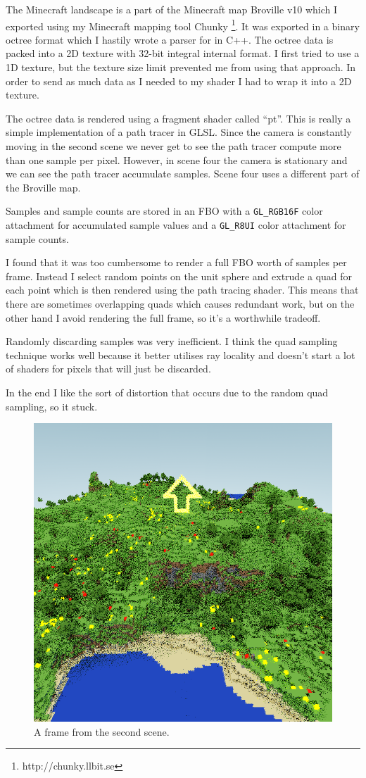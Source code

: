 \documentclass{acmsiggraph}               %
\begin{document}
The Minecraft landscape is a part of the Minecraft map Broville v10 which I
exported using my Minecraft mapping tool Chunky
\footnote{http://chunky.llbit.se}. It was exported in a binary octree format
which I hastily wrote a parser for in C++. The octree data is packed into a 2D
texture with 32-bit integral internal format. I first tried to use a 1D
texture, but the texture size limit prevented me from using that approach. In
order to send as much data as I needed to my shader I had to wrap it into a 2D
texture.

The octree data is rendered using a fragment shader called ``pt''. This is
really a simple implementation of a path tracer in GLSL.  Since the camera is
constantly moving in the second scene we never get to see the path tracer
compute more than one sample per pixel. However, in scene four the camera is
stationary and we can see the path tracer accumulate samples. Scene four
uses a different part of the Broville map.

Samples and sample counts are stored in an FBO with a \verb'GL_RGB16F' color
attachment for accumulated sample values and a \verb'GL_R8UI' color attachment
for sample counts.

I found that it was too cumbersome to render a full FBO worth of samples per
frame. Instead I select random points on the unit sphere and extrude a quad for
each point which is then rendered using the path tracing shader. This means
that there are sometimes overlapping quads which causes redundant work, but on
the other hand I avoid rendering the full frame, so it's a worthwhile tradeoff.

Randomly discarding samples was very inefficient. I think the quad sampling
technique works well because it better utilises ray locality and doesn't start
a lot of shaders for pixels that will just be discarded.

In the end I like the sort of distortion that occurs due to the random quad
sampling, so it stuck.

\begin{figure}[H]
    \centering
    \includegraphics[width=0.7\columnwidth]{raytrace.png}
    \caption{A frame from the second scene.}
\end{figure}
\end{document}
